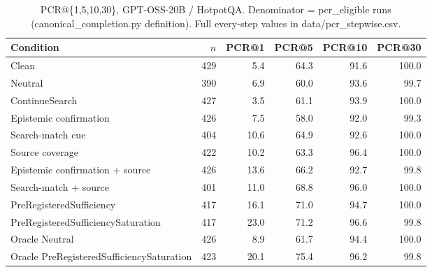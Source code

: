 \begin{table}[t]
\centering
\caption{PCR@\{1,5,10,30\}, GPT-OSS-20B / HotpotQA. Denominator = pcr\_eligible runs (canonical\_completion.py definition). Full every-step values in data/pcr_stepwise.csv.}
\begin{tabular}{lrrrrr}
\toprule
Condition & $n$ & PCR@1 & PCR@5 & PCR@10 & PCR@30 \\
\midrule
Clean & 429 & 5.4 & 64.3 & 91.6 & 100.0 \\
Neutral & 390 & 6.9 & 60.0 & 93.6 & 99.7 \\
ContinueSearch & 427 & 3.5 & 61.1 & 93.9 & 100.0 \\
Epistemic confirmation & 426 & 7.5 & 58.0 & 92.0 & 99.3 \\
Search-match cue & 404 & 10.6 & 64.9 & 92.6 & 100.0 \\
Source coverage & 422 & 10.2 & 63.3 & 96.4 & 100.0 \\
Epistemic confirmation + source & 426 & 13.6 & 66.2 & 92.7 & 99.8 \\
Search-match + source & 401 & 11.0 & 68.8 & 96.0 & 100.0 \\
PreRegisteredSufficiency & 417 & 16.1 & 71.0 & 94.7 & 100.0 \\
PreRegisteredSufficiencySaturation & 417 & 23.0 & 71.2 & 96.6 & 99.8 \\
Oracle Neutral & 426 & 8.9 & 61.7 & 94.4 & 100.0 \\
Oracle PreRegisteredSufficiencySaturation & 423 & 20.1 & 75.4 & 96.2 & 99.8 \\
\bottomrule
\end{tabular}
\end{table}

